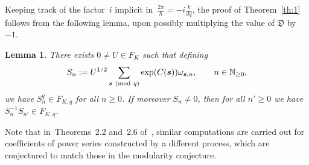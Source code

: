 \documentclass[11pt]{amsart}
\newcommand{\N}{\mathbb{N}}
\renewcommand{\mod}[1]{~\pr{\textnormal{mod}~#1}}
\newcommand{\hessK}{{\mathfrak D}}
\newtheorem{lemma}{Lemma}
\theoremstyle{definition}
\newcommand{\pr}[1]{\mathchoice{\left( #1\right)}{(#1)}{(#1)}{(#1)}}
\newcommand{\bs}{\boldsymbol }
\newcommand{\1}{{\mathbf 1}}
\let\originalleft\left
\let\originalright\right
\renewcommand{\left}{\mathopen{}\mathclose\bgroup\originalleft}
\renewcommand{\right}{\aftergroup\egroup\originalright}
\numberwithin{equation}{section}
\begin{document}
Keeping track of the factor~$i$ implicit in~$\frac{2\pi}{\hbar} = -i\frac{k}{dq}$, the proof of Theorem~\ref{th:1} follows from the following lemma, upon possibly multiplying the value of $\hessK$ by $-1$.



\begin{lemma}\label{conste}
  There exists $0\neq U\in F_K$ such that defining
  $$S_n:= U^{1/2} \sum_{\bs s \mod q}\exp(C(\bs s))\omega_{\bs s,n},\qquad n\in\N_{\geq 0},$$
  we have 
  $S_n^q \in F_{K, q}$ for all $n\geq0$. If moreover $S_n\neq0$, then for all $n'\geq0$ we have $S_n^{-1}S_{n'}\in F_{K,q}$.
\end{lemma}




Note that in~Theorems~2.2 and~2.6 of~\cite{DimofteGaroufalidis2018}, similar computations are carried out for coefficients of power series constructed by a different process, which are conjectured to match those in the modularity conjecture.
\end{document}
